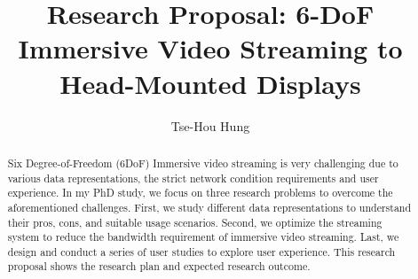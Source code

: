 \documentclass[sigconf]{acmart}
\begin{document}
%
\title{Research Proposal: 6-DoF Immersive Video Streaming to Head-Mounted Displays}

%
\author{Tse-Hou Hung}

\begin{abstract}
  Six Degree-of-Freedom (6DoF) Immersive video streaming is very challenging due to various data representations, 
  the strict network condition requirements and user experience. In my PhD 
  study, we focus on three research problems to overcome the aforementioned challenges.
  First, we study different data representations to understand their pros, cons, and suitable 
  usage scenarios. Second, we optimize the streaming system to reduce the bandwidth requirement of immersive video streaming.
  Last, we design and conduct a series of user studies to explore user experience.
  This research proposal shows the research plan and expected research outcome.
\end{abstract}
%
\maketitle







\end{document}
